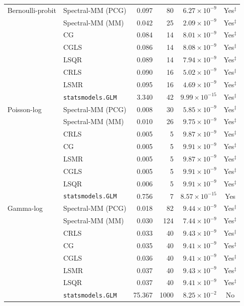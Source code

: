 \documentclass[10pt,a4paper]{article}
\begin{document}
\begin{longtable}{llrrrc}
\midrule
Bernoulli-probit & Spectral-MM (PCG) & 0.097 & 80 & $6.27\times10^{-9}$ & Yes$^{\ddagger}$ \\
 & Spectral-MM (MM) & 0.042 & 25 & $2.09\times10^{-9}$ & Yes$^{\ddagger}$ \\
 & CG & 0.084 & 14 & $8.01\times10^{-9}$ & Yes$^{\ddagger}$ \\
 & CGLS & 0.086 & 14 & $8.08\times10^{-9}$ & Yes$^{\ddagger}$ \\
 & LSQR & 0.089 & 14 & $7.94\times10^{-9}$ & Yes$^{\ddagger}$ \\
 & CRLS & 0.090 & 16 & $5.02\times10^{-9}$ & Yes$^{\ddagger}$ \\
 & LSMR & 0.095 & 16 & $4.69\times10^{-9}$ & Yes$^{\ddagger}$ \\
 & \texttt{statsmodels.GLM} & 3.340 & 42 & $9.99\times10^{-15}$ & Yes$^{\ddagger}$ \\
\midrule
Poisson-log & Spectral-MM (PCG) & 0.008 & 30 & $5.85\times10^{-9}$ & Yes$^{\ddagger}$ \\
 & Spectral-MM (MM) & 0.010 & 26 & $9.75\times10^{-9}$ & Yes$^{\ddagger}$ \\
 & CRLS & 0.005 & 5 & $9.87\times10^{-9}$ & Yes$^{\ddagger}$ \\
 & CG & 0.005 & 5 & $9.91\times10^{-9}$ & Yes$^{\ddagger}$ \\
 & LSMR & 0.005 & 5 & $9.87\times10^{-9}$ & Yes$^{\ddagger}$ \\
 & CGLS & 0.005 & 5 & $9.91\times10^{-9}$ & Yes$^{\ddagger}$ \\
 & LSQR & 0.006 & 5 & $9.91\times10^{-9}$ & Yes$^{\ddagger}$ \\
 & \texttt{statsmodels.GLM} & 0.756 & 7 & $8.57\times10^{-15}$ & Yes \\
\midrule
Gamma-log & Spectral-MM (PCG) & 0.018 & 82 & $9.44\times10^{-9}$ & Yes$^{\ddagger}$ \\
 & Spectral-MM (MM) & 0.030 & 124 & $7.44\times10^{-9}$ & Yes$^{\ddagger}$ \\
 & CRLS & 0.033 & 40 & $9.43\times10^{-9}$ & Yes$^{\ddagger}$ \\
 & CG & 0.035 & 40 & $9.41\times10^{-9}$ & Yes$^{\ddagger}$ \\
 & CGLS & 0.036 & 40 & $9.41\times10^{-9}$ & Yes$^{\ddagger}$ \\
 & LSMR & 0.037 & 40 & $9.43\times10^{-9}$ & Yes$^{\ddagger}$ \\
 & LSQR & 0.037 & 40 & $9.41\times10^{-9}$ & Yes$^{\ddagger}$ \\
 & \texttt{statsmodels.GLM} & 75.367 & 1000 & $8.25\times10^{-2}$ & No \\

\end{longtable}
\end{document}
